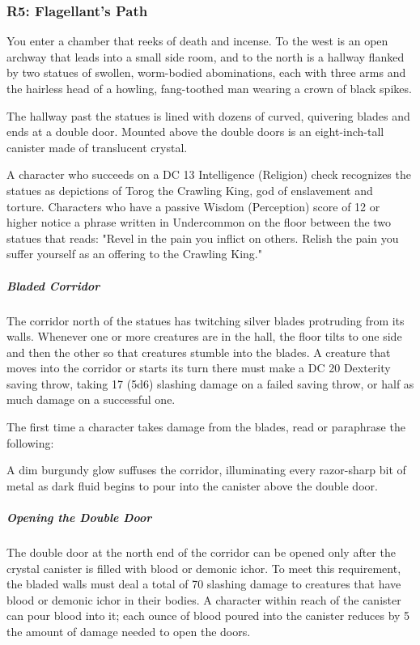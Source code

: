 \documentclass[10pt,a4paper,twoside,bg=print,twocolumn,openany,nodeprecatedcode]{dndbook}
\begin{document}
\subsubsection{R5: Flagellant's Path}
\begin{DndReadAloud}{}
You enter a chamber that reeks of death and incense. To the west is an open archway that leads into a small side room, and to the north is a hallway flanked by two statues of swollen, worm-bodied abominations, each with three arms and the hairless head of a howling, fang-toothed man wearing a crown of black spikes.

The hallway past the statues is lined with dozens of curved, quivering blades and ends at a double door. Mounted above the double doors is an eight-inch-tall canister made of translucent crystal.

\end{DndReadAloud}

A character who succeeds on a DC 13 Intelligence (Religion) check recognizes the statues as depictions of Torog the Crawling King, god of enslavement and torture. Characters who have a passive Wisdom (Perception) score of 12 or higher notice a phrase written in Undercommon on the floor between the two statues that reads: "Revel in the pain you inflict on others. Relish the pain you suffer yourself as an offering to the Crawling King."

\subparagraph{Bladed Corridor}
The corridor north of the statues has twitching silver blades protruding from its walls. Whenever one or more creatures are in the hall, the floor tilts to one side and then the other so that creatures stumble into the blades. A creature that moves into the corridor or starts its turn there must make a DC 20 Dexterity saving throw, taking 17 (5d6) slashing damage on a failed saving throw, or half as much damage on a successful one.

The first time a character takes damage from the blades, read or paraphrase the following:

\begin{DndReadAloud}{}
A dim burgundy glow suffuses the corridor, illuminating every razor-sharp bit of metal as dark fluid begins to pour into the canister above the double door.

\end{DndReadAloud}

\subparagraph{Opening the Double Door}
The double door at the north end of the corridor can be opened only after the crystal canister is filled with blood or demonic ichor. To meet this requirement, the bladed walls must deal a total of 70 slashing damage to creatures that have blood or demonic ichor in their bodies. A character within reach of the canister can pour blood into it; each ounce of blood poured into the canister reduces by 5 the amount of damage needed to open the doors.
\end{document}
